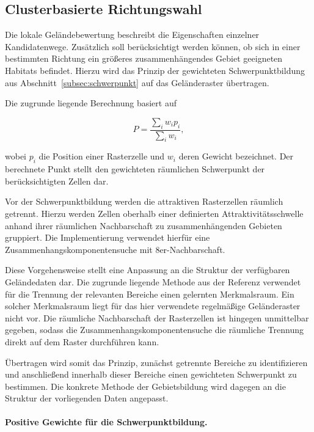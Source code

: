 \documentclass[12pt,a4paper]{report}
\begin{document}
\subsection{Clusterbasierte Richtungswahl}
\label{subsec:cluster}

Die lokale Geländebewertung beschreibt die Eigenschaften einzelner Kandidatenwege.
Zusätzlich soll berücksichtigt werden können, ob sich in einer bestimmten Richtung
ein größeres zusammenhängendes Gebiet geeigneten Habitats befindet. Hierzu wird
das Prinzip der gewichteten Schwerpunktbildung aus Abschnitt~\ref{subsec:schwerpunkt}
auf das Geländeraster übertragen.

Die zugrunde liegende Berechnung basiert auf

\begin{equation}
P =
\frac{\sum_i w_i p_i}
{\sum_i w_i},
\label{eq:schwerpunkt}
\end{equation}

wobei $p_i$ die Position einer Rasterzelle und $w_i$ deren Gewicht bezeichnet.
Der berechnete Punkt stellt den gewichteten räumlichen Schwerpunkt der
berücksichtigten Zellen dar.

Vor der Schwerpunktbildung werden die attraktiven Rasterzellen räumlich getrennt.
Hierzu werden Zellen oberhalb einer definierten Attraktivitätsschwelle anhand
ihrer räumlichen Nachbarschaft zu zusammenhängenden Gebieten gruppiert. Die
Implementierung verwendet hierfür eine Zusammenhangskomponentensuche mit
8er-Nachbarschaft.

Diese Vorgehensweise stellt eine Anpassung an die Struktur der verfügbaren
Geländedaten dar. Die zugrunde liegende Methode aus der Referenz verwendet für
die Trennung der relevanten Bereiche einen gelernten Merkmalsraum. Ein solcher
Merkmalsraum liegt für das hier verwendete regelmäßige Geländeraster nicht vor.
Die räumliche Nachbarschaft der Rasterzellen ist hingegen unmittelbar gegeben,
sodass die Zusammenhangskomponentensuche die räumliche Trennung direkt auf dem
Raster durchführen kann.

Übertragen wird somit das Prinzip, zunächst getrennte Bereiche zu identifizieren
und anschließend innerhalb dieser Bereiche einen gewichteten Schwerpunkt zu
bestimmen. Die konkrete Methode der Gebietsbildung wird dagegen an die
Struktur der vorliegenden Daten angepasst.

\paragraph{Positive Gewichte für die Schwerpunktbildung.}
\end{document}
